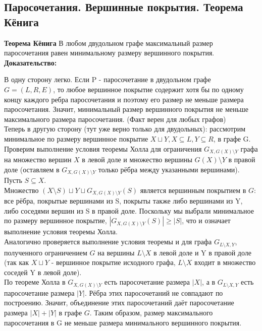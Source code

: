 \subsection{Паросочетания. Вершинные покрытия. Теорема Кёнига}

\textbf{Теорема Кёнига} В любом двудольном графе максимальный размер паросочетания равен минимальному размеру вершинного покрытия. \\

\noindent \textbf{Доказательство:} 

В одну сторону легко. Если P - паросочетание в двудольном графе $G =  (L, R, E)$, то любое вершинное покрытие содержит хотя бы по одному концу каждого ребра паросочетания и поэтому его размер не меньше размера паросочетания. Значит, минимальный размер вершинного покрытия не меньше максимального размера паросочетания. (Факт верен для любых графов) \\

Теперь в другую сторону (тут уже верно только для двудольных): рассмотрим минимальное по размеру вершинное покрытие $X \sqcup Y, X \subseteq L, Y \subseteq R$, в графе G. Проверим выполнение условия теоремы Холла для ограничения $G_{X, G(X) \setminus Y}$ графа на множество вершин $X$ в левой доле и множество вершины $G(X) \setminus Y$ в правой доле (оставляем в $G_{X, G(X) \setminus Y}$ только рёбра между указанными вершинами). Пусть $S \subseteq X$. \\

Множество $(X \setminus S) \sqcup Y \sqcup G_{X, G(X) \setminus Y}(S)$ является вершинным покрытием в $G$: все рёбра, покрытые вершинами из S, покрыты также либо вершинами из Y, либо соседями вершин из S в правой доле. Поскольку мы выбрали минимальное по размеру вершинное покрытие, $|G_{X, G(X) \setminus Y}(S)| \geq |S|$, что и означает выполнение условия теоремы Холла. \\

Аналогично проверяется выполнение условия теоремы и для графа $G_{L \setminus X, Y}$, полученного ограничением $G$ на вершины $L \setminus X$ в левой доле и Y в правой доле (так как $X \sqcup Y$ - вершинное покрытие исходного графа, $L \setminus X$ входит в множество соседей Y в левой доле). \\

По теореме Холла в $G_{X, G(X) \setminus Y}$ есть паросочетание размера $|X|$, а в $G_{L \setminus X, Y} $ есть паросочетание размера $|Y|$. Рёбра этих паросочетаний не совпадают по построению. Значит, объединение этих паросочетаний даёт паросочетание размера $|X| + |Y|$ в графе $G$. Таким образом, размер максимального паросочетания в G не меньше размера минимального вершинного покрытия. \\
